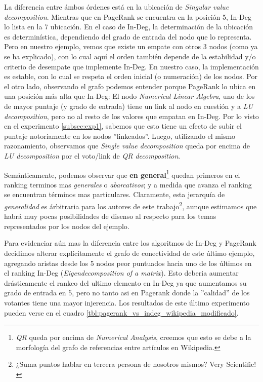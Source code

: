\par La diferencia entre \'ambos \'ordenes est\'a en la ubicaci\'on de
\emph{Singular value decomposition}. Mientras que en PageRank se encuentra en la
posici\'on 5, In-Deg lo lista en la 7 ubicaci\'on. En el caso de In-Deg, la
determinaci\'on de la ubicaci\'on es determin\'istica, dependiendo del grado de
entrada del nodo que lo representa. Pero en nuestro ejemplo, vemos que existe un
empate con otros 3 nodos (como ya se ha explicado), con lo cual aqu\'i el orden
tambi\'en depende de la estabilidad y/o criterio de desempate que implemente
In-Deg. En nuestro caso, la implementaci\'on es estable, con lo cual se respeta
el orden inicial (o numeraci\'on) de los nodos. Por el otro lado, observando el
grafo podemos entender porque PageRank lo ubica en una posici\'on m\'as alta que
In-Deg: El nodo \emph{Numerical Linear Algebra}, uno de los de mayor puntaje (y
grado de entrada) tiene un link al nodo en cuesti\'on y a \emph{LU
decomposition}, pero no al resto de los valores que empatan en In-Deg. Por lo
visto en el experimento \ref{subsec:exp1}, sabemos que esto tiene un efecto de
subir el puntaje notoriamente en los nodos ''linkeados''. Luego, utilizando el
mismo razonamiento, observamos que \emph{Single value decomposition} queda por
encima de \emph{LU decomposition} por el voto/link de \emph{QR decomposition}.

\par Semánticamente, podemos observar que \textbf{en general}\footnote{\emph{QR}
queda por encima de \emph{Numerical Analysis}, creemos que esto se debe a la
morfología del grafo de referencias entre artículos en Wikipedia.} quedan
primeros en el ranking terminos mas \emph{generales} o \emph{abarcativos}; y a
medida que avanza el ranking se encuentran términos mas particulares.
Claramente, esta jerarqu\'ia de \emph{generalidad} es \'arbitraria para los
autores de este trabajo\footnote{¿Suma puntos hablar en tercera persona de
nosotros mismos? Very Scientific!}, aunque estimamos que habr\'a muy pocas
posibilidades de disenso al respecto para los temas representados por los nodos
del ejemplo.

\par Para evidenciar aún mas la diferencia entre los algoritmos de In-Deg y
PageRank decidimos alterar expl\'icitamente el grafo de conectividad de este
\'ultimo ejemplo, agregando aristas desde los 5 nodos peor puntuados hacia uno
de los últimos en el ranking In-Deg (\emph{Eigendecomposition of a matrix}).
Esto deberia aumentar drásticamente el rankeo del ultimo elemento en In-Deg ya
que aumentamos su grado de entrada en 5, pero no tanto asi en Pagerank donde la
''calidad'' de los votantes tiene una mayor injerencia. Los resultados de este
último experimento pueden verse en el cuadro
\ref{tbl:pagerank_vs_indeg_wikipedia_modificado}. 

